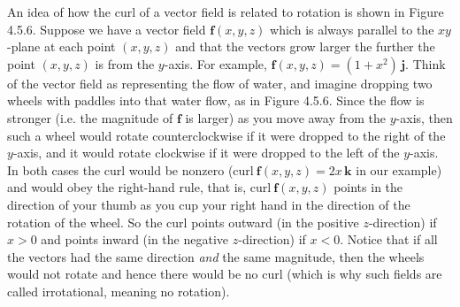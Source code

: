 An idea of how the curl of a vector field is related to rotation is shown in Figure 4.5.6. Suppose we have a
vector field $\mathbf{f}(x,y,z)$ which is always parallel to the $xy$-plane at each point $(x,y,z)$ and that
the vectors grow larger the further the point $(x,y,z)$ is from the $y$-axis. For example, $\mathbf{f}(x,y,z) =
(1+x^2 )\,\mathbf{j}$. Think of the vector field as representing the flow of water, and imagine dropping
two wheels with paddles into that water flow, as in Figure 4.5.6. 
Since the flow is stronger (i.e. the
magnitude of $\mathbf{f}$ is larger) as you move away from the $y$-axis, then such a wheel would rotate counterclockwise
if it were dropped to the
right of the $y$-axis, and it would rotate clockwise if it were dropped to the left of the $y$-axis. In both cases the
curl would be nonzero ($\text{curl}~\mathbf{f}(x,y,z) = 2x\,\mathbf{k}$ in our example) and would obey the right-hand
rule, that is, $\text{curl}~\mathbf{f}(x,y,z)$ points in the direction of your thumb as you cup your right hand in the
direction of the rotation of the wheel. So the curl points outward (in the positive $z$-direction) if $x > 0$ and points
inward (in the negative $z$-direction) if $x < 0$. Notice that if all the vectors had the same direction \emph{and} the
same magnitude, then the wheels would not rotate and hence there would be no curl (which is why such fields are
called irrotational, meaning no rotation).

